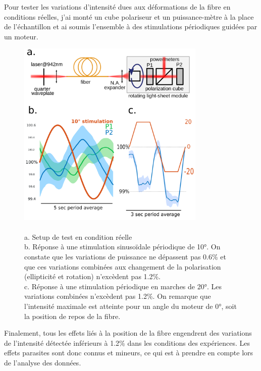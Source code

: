 Pour tester les variations d'intensité dues aux déformations de la fibre en conditions réelles, j'ai monté un cube polariseur et un puissance-mètre à la place de l'échantillon et ai soumis l'ensemble à des stimulations périodiques guidées par un moteur.

\begin{figure}
\centering
\includegraphics[width=0.8\textwidth]{./files/real-condition_intensity-variation.png}
\caption{
\\ a. Setup de test en condition réelle
\\ b. Réponse à une stimulation sinusoïdale périodique de 10°. On constate que les variations de puissance ne dépassent pas 0.6\% et que ces variations combinées aux changement de la polarisation (ellipticité et rotation) n'excèdent pas 1.2\%.
\\ c. Réponse à une stimulation périodique en marches de 20°. Les variations combinées n'excèdent pas 1.2\%. On remarque que l'intensité maximale est atteinte pour un angle du moteur de 0°, soit la position de repos de la fibre.
}
\end{figure}

Finalement, tous les effets liés à la position de la fibre engendrent des variations de l'intensité détectée inférieurs à 1.2\% dans les conditions des expériences. Les effets parasites sont donc connus et mineurs, ce qui est à prendre en compte lors de l'analyse des données.


